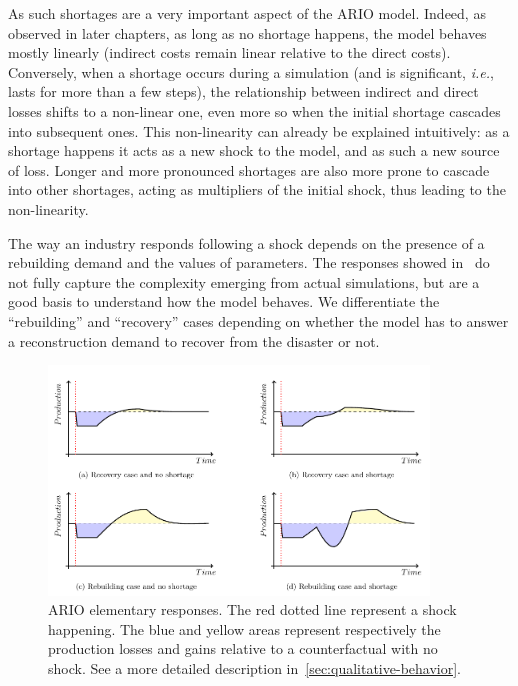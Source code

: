 \documentclass[main.tex]{subfiles}
\begin{document}
As such shortages are a very important aspect of the ARIO model. Indeed, as
observed in later chapters, as long as no shortage happens, the model behaves
mostly linearly (indirect costs remain linear relative to the direct costs). Conversely,
when a shortage occurs during a simulation (and is significant, \emph{i.e.},
lasts for more than a few steps), the relationship between indirect and direct
losses shifts to a non-linear one, even more so when the initial shortage
cascades into subsequent ones. This non-linearity can already be explained intuitively:
as a shortage happens it acts as a new shock to the model, and as such a new
source of loss. Longer and more pronounced shortages are also more prone to cascade
into other shortages, acting as multipliers of the initial shock, thus leading
to the non-linearity.

The way an industry responds following a shock depends on the presence of a
rebuilding demand and the values of parameters. The responses showed
in~ do not fully capture the complexity emerging from
actual simulations, but are a good basis to understand how the model behaves. We
differentiate the ``rebuilding'' and ``recovery'' cases depending on whether the
model has to answer a reconstruction demand to recover from the disaster or not.

\begin{figure}[ht]
  \includegraphics[width=0.9\textwidth]{imgs/ARIO-basic-responses}
  \caption[ARIO elementary responses]{ARIO elementary responses. The red dotted
    line represent a shock happening. The blue and yellow areas represent respectively the production
    losses and gains relative to a counterfactual with no shock. See a more detailed
    description in~\cref{sec:qualitative-behavior}.\label{fig:ario-responses}}
\end{figure}
\end{document}
